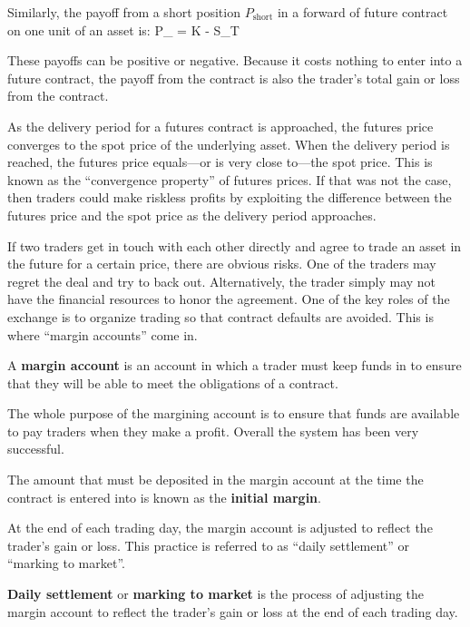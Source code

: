 Similarly, the payoff from a short position $P_{\text{short}}$ in a forward of future contract on one unit of an asset
is:
\bse
P_{} = K - S_T
\ese

These payoffs can be positive or negative. Because it costs nothing to enter into a future contract, the payoff from
the contract is also the trader's total gain or loss from the contract.

\vspace{5pt}

As the delivery period for a futures contract is approached, the futures price converges to the spot price of the
underlying asset. When the delivery period is reached, the futures price equals—or is very close to—the spot price.
This is known as the ``convergence property'' of futures prices. If that was not the case, then traders could make
riskless profits by exploiting the difference between the futures price and the spot price as the delivery period
approaches.


If two traders get in touch with each other directly and agree to trade an asset in the future for a certain price,
there are obvious risks. One of the traders may regret the deal and try to back out. Alternatively, the trader
simply may not have the financial resources to honor the agreement. One of the key roles of the exchange is to
organize trading so that contract defaults are avoided. This is where ``margin accounts'' come in.

A \textbf{margin account} is an account in which a trader must keep funds in to ensure that they will be able to meet
the obligations of a contract.
\ed

The whole purpose of the margining account is to ensure that funds are available to pay traders when they make a
profit. Overall the system has been very successful.

The amount that must be deposited in the margin account at the time the contract is entered into is known as the
\textbf{initial margin}.
\ed

At the end of each trading day, the margin account is adjusted to reflect the trader's gain or loss. This practice is
referred to as ``daily settlement'' or ``marking to market''.

\textbf{Daily settlement} or \textbf{marking to market} is the process of adjusting the margin account to reflect the
trader's gain or loss at the end of each trading day.
\ed

